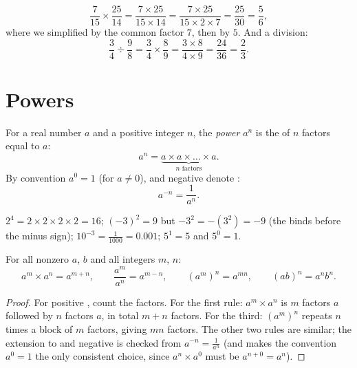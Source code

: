 \begin{example}\label{ex:g9:fractions:mult}
\[
\frac{7}{15} \times \frac{25}{14}
= \frac{7 \times 25}{15 \times 14}
= \frac{7 \times 25}{15 \times 2 \times 7}
= \frac{25}{30} = \frac56,
\]
where we simplified by the common factor $7$, then by $5$. And a
division:
\[
\frac{3}{4} \div \frac{9}{8}
= \frac34 \times \frac89
= \frac{3 \times 8}{4 \times 9}
= \frac{24}{36} = \frac23 .
\]
\end{example}

\section{Powers}

\begin{definition}[Power]\label{def:g9:fractions:power}
For a real number $a$ and a positive integer $n$, the
\emph{power} $a^n$ is the  of $n$ factors equal to
$a$:
\[
a^n = \underbrace{a \times a \times \dots \times a}_{n \text{ factors}} .
\]
By convention $a^0 = 1$ (for $a \neq 0$), and negative  denote
:
\[
a^{-n} = \frac{1}{a^n}.
\]
\end{definition}

\begin{example}
$2^4 = 2 \times 2 \times 2 \times 2 = 16$; \quad
$(-3)^2 = 9$ but $-3^2 = -(3^2) = -9$ (the  binds before the
minus sign); \quad $10^{-3} = \frac{1}{1000} = 0.001$; \quad
$5^1 = 5$ and $5^0 = 1$.
\end{example}

\begin{theorem}\label{thm:g9:fractions:rules}
For all nonzero $a$, $b$ and all integers $m$, $n$:
\[
a^m \times a^n = a^{m+n},
\qquad
\frac{a^m}{a^n} = a^{m-n},
\qquad
\left(a^m\right)^n = a^{mn},
\qquad
(ab)^n = a^n b^n .
\]
\end{theorem}

\begin{proof}
For positive , count the factors. For the first rule:
$a^m \times a^n$ is $m$ factors $a$ followed by $n$ factors $a$, in total
$m + n$ factors. For the third:
$\left(a^m\right)^n$ repeats $n$ times a block of $m$ factors, giving
$mn$ factors. The other two rules are similar; the extension to  and
negative  is checked from $a^{-n} = \frac{1}{a^n}$ (and makes
the convention $a^0 = 1$ the only consistent choice, since
$a^n \times a^0$ must be $a^{n+0} = a^n$).
\end{proof}

